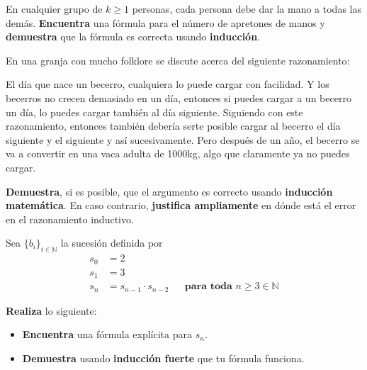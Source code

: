 \documentclass[oneside]{style}
\begin{document}
\begin{questions}[label=\protect\circled{\bfseries\arabic*}]
    \question
    {
        En cualquier grupo de $k \geq 1$ personas, cada persona debe dar la 
        mano a todas las demás. \textbf{Encuentra} una fórmula para el número 
        de apretones de manos y \textbf{demuestra} que la fórmula es correcta 
        usando \textbf{inducción}. 
    }

    \question
    {
        En una granja con mucho folklore se discute acerca del siguiente 
        razonamiento: 
        \begin{tcolorbox}
            El día que nace un becerro, cualquiera lo puede cargar con 
            facilidad. Y los becerros no crecen demasiado en un día, entonces 
            si puedes cargar a un becerro un día, lo puedes cargar también al 
            día siguiente. Siguiendo con este razonamiento, entonces también 
            debería serte posible cargar al becerro el día siguiente y el 
            siguiente y así sucesivamente. Pero después de un año, el becerro 
            se va a convertir en una vaca adulta de 1000kg, algo que claramente 
            ya no puedes cargar.
        \end{tcolorbox}

        \textbf{Demuestra}, si es posible, que el argumento es correcto 
        usando \textbf{inducción matemática}. En caso contrario, \textbf{justifica 
        ampliamente} en dónde está el error en el razonamiento inductivo. 
    }

    \question
    {
        Sea $\{b_i\}_{i \in \mathbb{N}}$ la sucesión definida por 
        \begin{align*}
            s_0 &= 2 \\ 
            s_1 &= 3 \\ 
            s_n &= s_{n-1} \cdot s_{n-2} 
            && \textbf{para toda } n \geq 3 \in \mathbb{N}
        \end{align*}
        
        \textbf{Realiza} lo siguiente:
        \begin{itemize}
            \item \textbf{Encuentra} una fórmula explícita para 
            $s_n$. 

            \item \textbf{Demuestra} usando \textbf{inducción fuerte} 
            que tu fórmula funciona. 
        \end{itemize}
    }
\end{questions}
\end{document}
